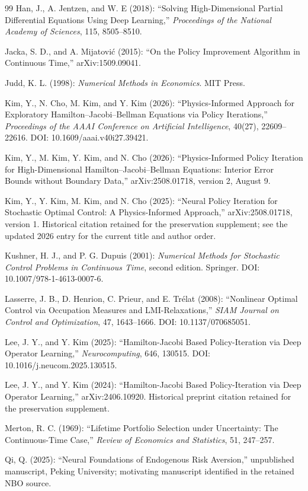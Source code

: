 \begin{thebibliography}{99}
 Han, J., A. Jentzen, and W. E (2018): ``Solving High-Dimensional Partial Differential Equations Using Deep Learning,'' \emph{Proceedings of the National Academy of Sciences}, 115, 8505--8510.

 Jacka, S. D., and A. Mijatovi\'c (2015): ``On the Policy Improvement Algorithm in Continuous Time,'' arXiv:1509.09041.

 Judd, K. L. (1998): \emph{Numerical Methods in Economics}. MIT Press.

 Kim, Y., N. Cho, M. Kim, and Y. Kim (2026): ``Physics-Informed Approach for Exploratory Hamilton--Jacobi--Bellman Equations via Policy Iterations,'' \emph{Proceedings of the AAAI Conference on Artificial Intelligence}, 40(27), 22609--22616. DOI: 10.1609/aaai.v40i27.39421.

 Kim, Y., M. Kim, Y. Kim, and N. Cho (2026): ``Physics-Informed Policy Iteration for High-Dimensional Hamilton--Jacobi--Bellman Equations: Interior Error Bounds without Boundary Data,'' arXiv:2508.01718, version 2, August 9.

 Kim, Y., Y. Kim, M. Kim, and N. Cho (2025): ``Neural Policy Iteration for Stochastic Optimal Control: A Physics-Informed Approach,'' arXiv:2508.01718, version 1. Historical citation retained for the preservation supplement; see the updated 2026 entry for the current title and author order.

 Kushner, H. J., and P. G. Dupuis (2001): \emph{Numerical Methods for Stochastic Control Problems in Continuous Time}, second edition. Springer. DOI: 10.1007/978-1-4613-0007-6.

 Lasserre, J. B., D. Henrion, C. Prieur, and E. Tr\'elat (2008): ``Nonlinear Optimal Control via Occupation Measures and LMI-Relaxations,'' \emph{SIAM Journal on Control and Optimization}, 47, 1643--1666. DOI: 10.1137/070685051.

 Lee, J. Y., and Y. Kim (2025): ``Hamilton-Jacobi Based Policy-Iteration via Deep Operator Learning,'' \emph{Neurocomputing}, 646, 130515. DOI: 10.1016/j.neucom.2025.130515.

 Lee, J. Y., and Y. Kim (2024): ``Hamilton-Jacobi Based Policy-Iteration via Deep Operator Learning,'' arXiv:2406.10920. Historical preprint citation retained for the preservation supplement.

 Merton, R. C. (1969): ``Lifetime Portfolio Selection under Uncertainty: The Continuous-Time Case,'' \emph{Review of Economics and Statistics}, 51, 247--257.

 Qi, Q. (2025): ``Neural Foundations of Endogenous Risk Aversion,'' unpublished manuscript, Peking University; motivating manuscript identified in the retained NBO source.

\end{thebibliography}

